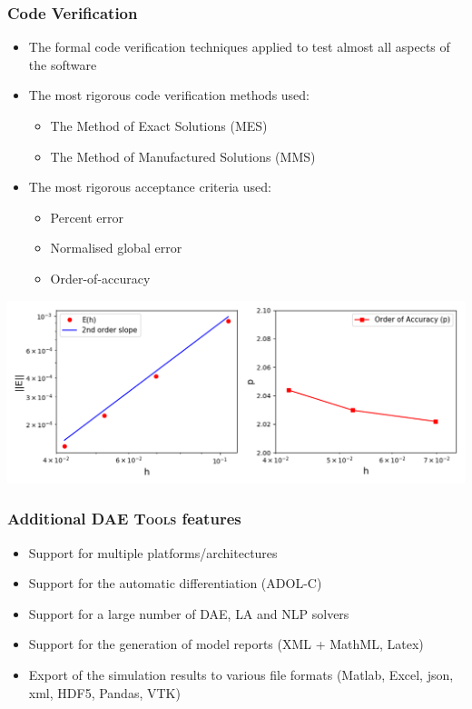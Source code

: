 \documentclass[compress,newPxFont,sthlmFooter]{beamer}
\begin{document}
\begin{frame}[plain]
\frametitle{Code Verification}
  \begin{itemize}
      \item The \alert{formal code verification techniques} applied to test almost all aspects of the software
      \item The \alert{most rigorous code verification methods} used:
        \begin{itemize}
          \item The \alert{Method of Exact Solutions} (MES) 
          \item The \alert{Method of Manufactured Solutions} (MMS)
        \end{itemize}
      \item The \alert{most rigorous acceptance criteria} used:
        \begin{itemize}
          \item Percent error
          \item Normalised global error
          \item \alert{Order-of-accuracy}
        \end{itemize}
  \end{itemize}
  \begin{center}
      \includegraphics[align=c, height=0.35\paperheight]{code_verification.png}
  \end{center}
\end{frame}

\begin{frame}
\frametitle{Additional \textsc{DAE Tools} features}
    \begin{itemize}
        \item Support for \alert{multiple platforms/architectures} 
        \item Support for the \alert{automatic differentiation} (ADOL-C)
        \item Support for a large number of \alert{DAE}, \alert{LA} and \alert{NLP} solvers 
        \item Support for the generation of \alert{model reports} (XML + MathML, Latex)
        \item \alert{Export} of the \alert{simulation results} to various file formats (Matlab, Excel, json, xml, HDF5, Pandas, VTK)
    \end{itemize}
\end{frame}
\end{document}
